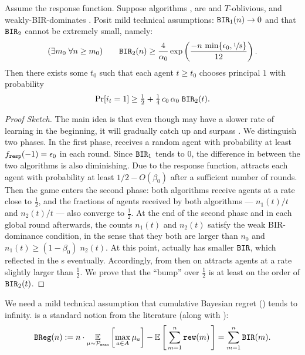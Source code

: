 \begin{theorem}\label{thm:SoftMax-strong}
Assume the \SoftMaxRandom response function. Suppose algorithms \alg[1], \alg[2] are \bmonotone and $T$-oblivious, and \alg[1] weakly-BIR-dominates \alg[2]. Posit mild technical assumptions:
  $\mathtt{BIR}_1(n) \to 0$ and that $\mathtt{BIR}_2$ cannot be extremely small, namely:
\begin{align}\label{eq:SoftMax-assn-strong}
(\exists m_0\; \forall n\geq m_0) \qquad
\mathtt{BIR}_2(n) \geq \frac{4}{\alpha_0}
\exp \left( \frac{-n\,\min\{\epsilon_0, \nicefrac{1}{8}\}}{12}\right).
\end{align}
Then there
  exists some $t_0$ such that each agent $t\geq t_0$ chooses principal
  $1$ with probability
\begin{align}\label{eq:thm:SoftMax-strong}
     \Pr[i_t = 1]\geq \tfrac12 +  \tfrac14 \,c_0\,\alpha_0\; \mathtt{BIR}_2(t).
\end{align}
\end{theorem}

\begin{proof}[Proof Sketch]
The main idea is that even though \alg[1] may have a
slower rate of learning in the beginning, it will gradually catch up
and surpass \alg[2]. We distinguish two phases. In
the first phase, \alg[1] receives a random agent with probability at
least $f_{\mathtt{resp}}(-1) = \epsilon_0$ in each round. Since $\mathtt{BIR}_1$ tends to 0,
the difference in  between the two algorithms is also
diminishing. Due to the \SoftMaxRandom response function, \alg[1]
attracts each agent with probability at least $1/2 - O(\beta_0)$ after
a sufficient number of rounds. Then the game enters the second phase:
both algorithms receive agents at a rate close to $\tfrac12$, and the
fractions of agents received by both algorithms --- $n_1(t)/t$ and
$n_2(t)/t$ --- also converge to $\tfrac12$. At the end of the second
phase and in each global round afterwards, the counts $n_1(t)$ and
$n_2(t)$ satisfy the weak BIR-dominance condition, in the sense that
they both are larger than $n_0$ and $n_1(t)\geq (1-\beta_0)\; n_2(t)$.
At this point, \alg[1] actually has smaller $\mathtt{BIR}$, which reflected in the {\PMR}s eventually. Accordingly, from then on \alg[1]
attracts agents at a rate slightly larger than $\tfrac12$. We prove
that the ``bump'' over $\tfrac12$ is at least on the order of
$\mathtt{BIR}_2(t)$.
\end{proof}

 We need a mild technical assumption that cumulative Bayesian regret (\BReg) tends to infinity. \BReg is a standard notion from the literature (along with \BIR):
\begin{align}\label{eq:SoftMax-BReg}
\BReg(n) := n\cdot \E_{\mu\sim\priorMu}
    \left[ \max_{a\in A} \mu_a\right] -
    \E\sbr{ \sum_{m=1}^n \rew(m)}
    = \sum_{m=1}^n \BIR(m).
\end{align}


